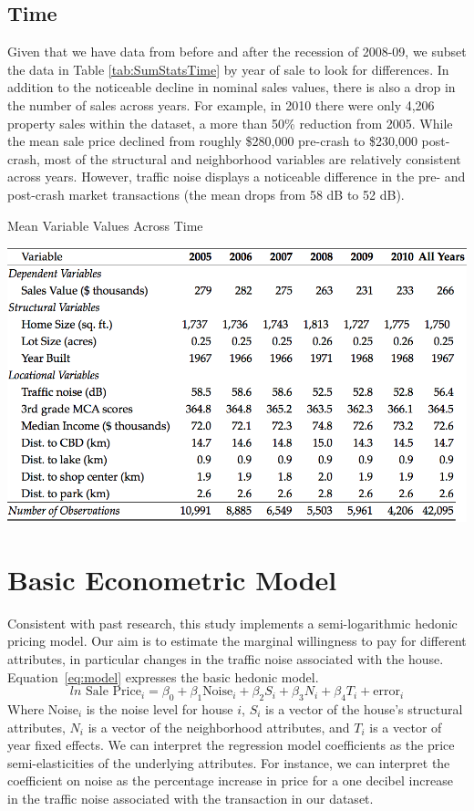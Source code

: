 \documentclass{article}\usepackage{graphicx, color}
\begin{document}
\subsection{Time}
Given that we have data from before and after the recession of 2008-09, we subset the data in Table \ref{tab:SumStatsTime} by year of sale to look for differences. In addition to the noticeable decline in nominal sales values, there is also a drop in the number of sales across years. For example, in 2010 there were only 4,206 property sales within the dataset, a more than 50\% reduction from 2005. While the mean sale price declined from roughly \$280,000 pre-crash to \$230,000 post-crash, most of the structural and neighborhood variables are relatively consistent across years. However, traffic noise displays a noticeable difference in the pre- and post-crash market transactions (the mean drops from 58 dB to 52 dB). 

\begin{table}
\caption{Mean Variable Values Across Time}\label{tab:SumStatsTime}
\includegraphics[width = \textwidth]{../graphs/DescriptiveStatsByYear}
\end{table}

\section{Basic Econometric Model}\label{basicModel}
Consistent with past research, this study implements a semi-logarithmic hedonic pricing model. Our aim is to estimate the marginal willingness to pay for different attributes, in particular changes in the traffic noise associated with the house. Equation~\eqref{eq:model} expresses the basic hedonic model.
\begin{equation}\label{eq:model}	
ln \textrm{ Sale Price}_i = \beta _0 + \beta _1 \textrm{Noise}_i+ \beta _2 S_i+ \beta _3 N_i + \beta _4 T_i + \textrm{error}_i
\end{equation}
Where Noise$_i$ is the noise level for house $i$, $S_i$ is a vector of the house's structural attributes, $N_i$ is a vector of the neighborhood attributes, and $T_i$ is a vector of year fixed effects. We can interpret the regression model coefficients as the price semi-elasticities of the underlying attributes. For instance, we can interpret the coefficient on noise as the percentage increase in price for a one decibel increase in the traffic noise associated with the transaction in our dataset. 
\end{document}
